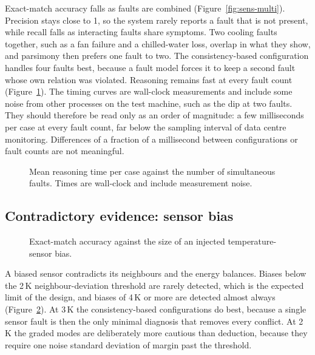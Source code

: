 

Exact-match accuracy falls as faults are combined (Figure~\ref{fig:sens-multi}). Precision stays close to 1, so the system rarely reports a fault that is not present, while recall falls as interacting faults share symptoms. Two cooling faults together, such as a fan failure and a chilled-water loss, overlap in what they show, and parsimony then prefers one fault to two. The consistency-based configuration handles four faults best, because a fault model forces it to keep a second fault whose own relation was violated. Reasoning remains fast at every fault count (Figure~\ref{fig:sens-multi-time}). The timing curves are wall-clock measurements and include some noise from other processes on the test machine, such as the dip at two faults. They should therefore be read only as an order of magnitude: a few milliseconds per case at every fault count, far below the sampling interval of data centre monitoring. Differences of a fraction of a millisecond between configurations or fault counts are not meaningful.

\begin{figure}[htbp]
  \centering
  
  \caption{Mean reasoning time per case against the number of simultaneous faults. Times are wall-clock and include measurement noise.}
  \label{fig:sens-multi-time}
\end{figure}

\subsection{Contradictory evidence: sensor bias}

\begin{figure}[htbp]
  \centering
  
  \caption{Exact-match accuracy against the size of an injected temperature-sensor bias.}
  \label{fig:sens-bias}
\end{figure}



A biased sensor contradicts its neighbours and the energy balances. Biases below the 2\,K neighbour-deviation threshold are rarely detected, which is the expected limit of the design, and biases of 4\,K or more are detected almost always (Figure~\ref{fig:sens-bias}). At 3\,K the consistency-based configurations do best, because a single sensor fault is then the only minimal diagnosis that removes every conflict. At 2\,K the graded modes are deliberately more cautious than deduction, because they require one noise standard deviation of margin past the threshold.

